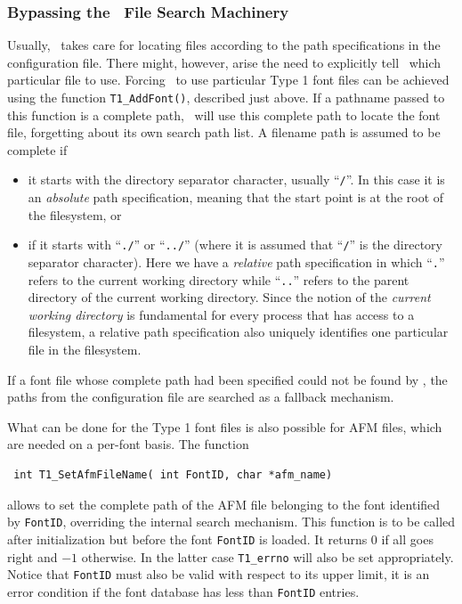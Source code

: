 \subsubsection{Bypassing the \tonelib\ File Search Machinery} 
\label{afmfilenames}%
Usually, \tonelib\ takes care for locating files according to the path
specifications in the configuration file. There might, however, arise the need
to explicitly tell \tonelib\ which particular file to use. Forcing \tonelib\ to
use particular Type 1 font files can be achieved using the function
\verb+T1_AddFont()+, described just above. If a pathname passed to this
function is a complete path, \tonelib\ will use this complete path to locate
the font file, forgetting about its own search path list. A filename path is
assumed to be complete if 
\begin{itemize}
\item it starts with the directory separator character, usually
  ``\verb+/+''. In this case it is an {\em absolute} path specification, meaning
  that the start point is at the root of the filesystem, or
\item if it starts with ``\verb+./+'' or ``\verb+../+'' (where it is assumed
  that ``\verb+/+'' is the directory separator character). Here we have a {\em
    relative} path specification in which ``\verb+.+'' refers to the current
  working directory while ``\verb+..+'' refers to the parent directory of the
  current working directory. Since the notion of the {\em current working
    directory} is fundamental for every process that has access to a
  filesystem, a relative path specification also uniquely identifies one
  particular file in the filesystem.
\end{itemize}
If a font file whose complete path had been specified could not be found by
\tonelib, the paths from the configuration file are searched as a fallback
mechanism. 

What can be done for the Type 1 font files is also possible for AFM files,
which are needed on a per-font basis. The function
\precorr
\begin{verbatim}
 int T1_SetAfmFileName( int FontID, char *afm_name)
\end{verbatim}\postcorr
allows to set the complete path of the AFM file belonging to the font
identified by \verb+FontID+, overriding the internal
search mechanism. This function is to be called after initialization but
before the font \verb+FontID+ is loaded. It returns 0 if all goes right and
$-1$ otherwise. In the latter case \verb+T1_errno+ will also be set
appropriately. Notice that \verb+FontID+ must also be valid with respect to
its upper limit, it is an error condition if the font database has less than
\verb+FontID+ entries. 

